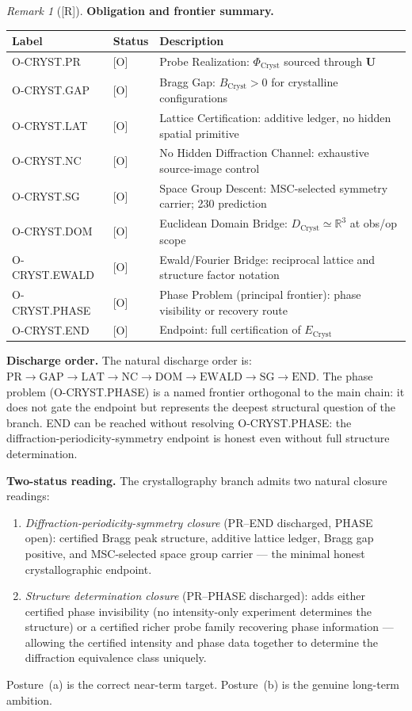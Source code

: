 \documentclass[12pt,oneside]{amsbook}
\theoremstyle{plain}
\theoremstyle{definition}
\theoremstyle{remark}
\newtheorem{remark}[theorem]{Remark}
\newcommand{\status}[1]{\textup{[#1]}}
\begin{document}
\begin{remark}[\status{R}]\label{rem:cryst-closure}
\textbf{Obligation and frontier summary.}

\medskip
\noindent
\begin{tabular}{|l|l|p{7.8cm}|}
\hline
\textbf{Label} & \textbf{Status} & \textbf{Description} \\
\hline
O-CRYST.PR    & [O] & Probe Realization: $\Phi_{\mathrm{Cryst}}$ sourced through $\mathbf{U}$ \\
O-CRYST.GAP   & [O] & Bragg Gap: $B_{\mathrm{Cryst}} > 0$ for crystalline configurations \\
O-CRYST.LAT   & [O] & Lattice Certification: additive ledger, no hidden spatial primitive \\
O-CRYST.NC    & [O] & No Hidden Diffraction Channel: exhaustive source-image control \\
O-CRYST.SG    & [O] & Space Group Descent: MSC-selected symmetry carrier; 230 prediction \\
O-CRYST.DOM   & [O] & Euclidean Domain Bridge: $D_{\mathrm{Cryst}} \simeq \mathbb{R}^3$ at obs/op scope \\
O-CRYST.EWALD & [O] & Ewald/Fourier Bridge: reciprocal lattice and structure factor notation \\
O-CRYST.PHASE & [O] & Phase Problem (principal frontier): phase visibility or recovery route \\
O-CRYST.END   & [O] & Endpoint: full certification of $E_{\mathrm{Cryst}}$ \\
\hline
\end{tabular}

\medskip
\textbf{Discharge order.}
The natural discharge order is:
$\mathrm{PR} \to \mathrm{GAP} \to \mathrm{LAT} \to \mathrm{NC}
\to \mathrm{DOM} \to \mathrm{EWALD} \to \mathrm{SG} \to \mathrm{END}$.
The phase problem (O-CRYST.PHASE) is a named frontier orthogonal to
the main chain: it does not gate the endpoint but represents the
deepest structural question of the branch.  END can be reached
without resolving O-CRYST.PHASE: the diffraction-periodicity-symmetry
endpoint is honest even without full structure determination.

\medskip
\textbf{Two-status reading.}
The crystallography branch admits two natural closure readings:
\begin{enumerate}[label=\textup{(\alph*)}]
  \item \emph{Diffraction-periodicity-symmetry closure} (PR--END
    discharged, PHASE open): certified Bragg peak structure,
    additive lattice ledger, Bragg gap positive, and MSC-selected
    space group carrier --- the minimal honest crystallographic
    endpoint.
  \item \emph{Structure determination closure} (PR--PHASE
    discharged): adds either certified phase invisibility (no
    intensity-only experiment determines the structure) or a
    certified richer probe family recovering phase information ---
    allowing the certified intensity and phase data together to
    determine the diffraction equivalence class uniquely.
\end{enumerate}
Posture~(a) is the correct near-term target.  Posture~(b) is the
genuine long-term ambition.


\end{remark}
\end{document}
